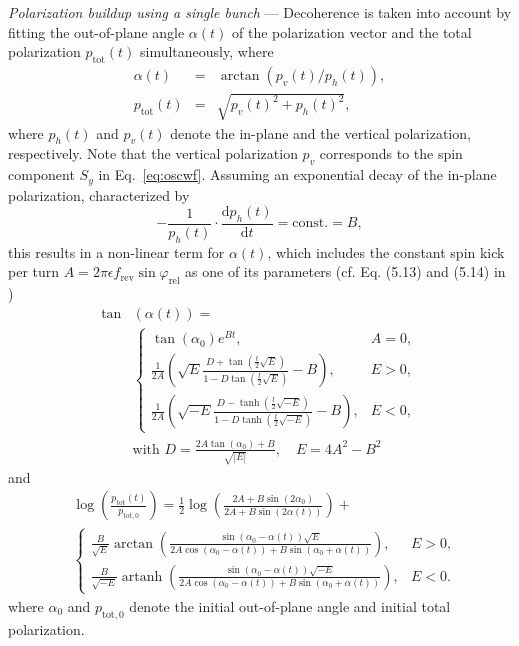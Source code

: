 \documentclass[
    10pt,
    twocolumn,
    secnumarabic,
    amssymb,
    nobibnotes,
    aps,
    prl,

    longbibliography,
    superscriptaddress
    ]{revtex4-2}
\newcommand{\phirel}{\varphi_\mathrm{rel} }
\newcommand{\fc}{f_\mathrm{rev} }
\begin{document}
\textit{Polarization buildup using a single bunch} ---
Decoherence is taken into account by fitting the out-of-plane angle $\alpha(t)$ of the polarization vector and the total polarization $p_\mathrm{tot}(t)$ simultaneously, where
\begin{eqnarray}
    \alpha(t) &=& \arctan(p_v(t)/p_h(t)), \\
    p_\mathrm{tot}(t) &=& \sqrt{p_v(t)^2 + p_h(t)^2},
\end{eqnarray}
where $p_h(t)$ and $p_v(t)$ denote the in-plane and the vertical polarization, respectively.
Note that the vertical polarization $p_v$ corresponds to the spin component $S_y$ in Eq.~\ref{eq:oscwf}.
Assuming an exponential decay of the in-plane polarization, characterized by
\begin{equation}
-\frac{1}{p_h(t)}\cdot\frac{\mathrm{d}p_h(t)}{\mathrm{d}t} = \mathrm{const}. = B,
\end{equation}
this results in a non-linear term for $\alpha(t)$, which includes the constant spin kick per turn $A = 2\pi\epsilon\fc \sin\phirel$ as one of its parameters (cf. Eq. (5.13) and (5.14) in \cite{Hempelmann:718035})
\begin{equation}
\begin{aligned}
\tan&(\alpha(t)) = \\[-1mm]
&\begin{cases}
\tan(\alpha_0) e^{B t}, & A = 0, \\[2mm]
\frac{1}{2A} \left( \sqrt{E} \frac{D + \tan\left(\frac{t}{2}\sqrt{E}\right)}{1 - D \tan\left(\frac{t}{2}\sqrt{E}\right)} - B \right), & E > 0, \\[1mm]
\frac{1}{2A} \left( \sqrt{-E} \frac{D - \tanh\left(\frac{t}{2}\sqrt{-E}\right)}{1 - D \tanh\left(\frac{t}{2}\sqrt{-E}\right)} - B \right), & E < 0,
\end{cases} \\[1mm]
&\text{with } D = \frac{2A \tan(\alpha_0) + B}{\sqrt{|E|}}, \quad E = 4A^2 - B^2
\end{aligned}
\end{equation}
and
\begin{equation}
  \begin{aligned}
    &\log \left(\frac{p_{\text{tot}}(t)}{p_{\text{tot},0}}\right)= \frac{1}{2} \log \left(\frac{2 A+B \sin \left(2\alpha_{0}\right)}{2 A+B \sin(2 \alpha(t))}\right)+ \\ &\begin{cases}
    \frac{B}{\sqrt{E}} \arctan \left(\frac{\sin\left(\alpha_{0}-\alpha(t)\right) \sqrt{E}}{2 A \cos\left(\alpha_{0}-\alpha(t)\right)+B \sin\left(\alpha_{0}+\alpha(t)\right)}\right), & E>0, \\
    \frac{B}{\sqrt{-E}} \operatorname{artanh}\left(\frac{\sin \left(\alpha_{0}-\alpha(t)\right) \sqrt{-E}}{2 A \cos \left(\alpha_{0}-\alpha(t)\right)+B \sin \left(\alpha_{0}+\alpha(t)\right)}\right), & E<0.
  \end{cases}
  \end{aligned}
\end{equation}
where $\alpha_0$ and $p_{\text{tot},0}$ denote the initial out-of-plane angle and initial total polarization.
\end{document}

